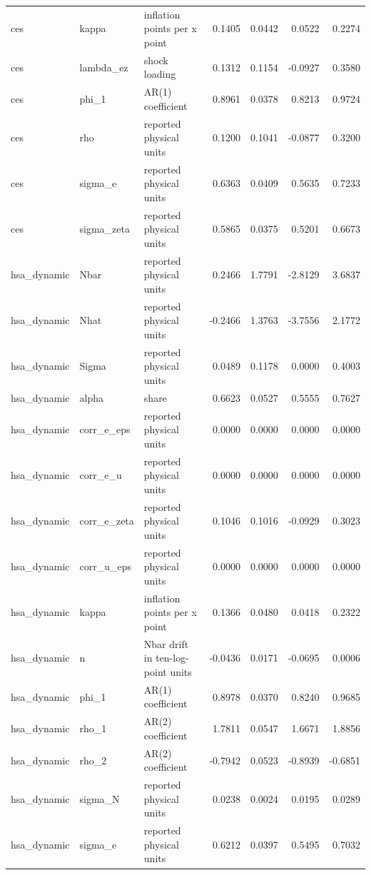 \begin{tabular}{lllrrrr}
ces & kappa & inflation points per x point & 0.1405 & 0.0442 & 0.0522 & 0.2274 \\
ces & lambda\_ez & shock loading & 0.1312 & 0.1154 & -0.0927 & 0.3580 \\
ces & phi\_1 & AR(1) coefficient & 0.8961 & 0.0378 & 0.8213 & 0.9724 \\
ces & rho & reported physical units & 0.1200 & 0.1041 & -0.0877 & 0.3200 \\
ces & sigma\_e & reported physical units & 0.6363 & 0.0409 & 0.5635 & 0.7233 \\
ces & sigma\_zeta & reported physical units & 0.5865 & 0.0375 & 0.5201 & 0.6673 \\
hsa\_dynamic & Nbar & reported physical units & 0.2466 & 1.7791 & -2.8129 & 3.6837 \\
hsa\_dynamic & Nhat & reported physical units & -0.2466 & 1.3763 & -3.7556 & 2.1772 \\
hsa\_dynamic & Sigma & reported physical units & 0.0489 & 0.1178 & 0.0000 & 0.4003 \\
hsa\_dynamic & alpha & share & 0.6623 & 0.0527 & 0.5555 & 0.7627 \\
hsa\_dynamic & corr\_e\_eps & reported physical units & 0.0000 & 0.0000 & 0.0000 & 0.0000 \\
hsa\_dynamic & corr\_e\_u & reported physical units & 0.0000 & 0.0000 & 0.0000 & 0.0000 \\
hsa\_dynamic & corr\_e\_zeta & reported physical units & 0.1046 & 0.1016 & -0.0929 & 0.3023 \\
hsa\_dynamic & corr\_u\_eps & reported physical units & 0.0000 & 0.0000 & 0.0000 & 0.0000 \\
hsa\_dynamic & kappa & inflation points per x point & 0.1366 & 0.0480 & 0.0418 & 0.2322 \\
hsa\_dynamic & n & Nbar drift in ten-log-point units & -0.0436 & 0.0171 & -0.0695 & 0.0006 \\
hsa\_dynamic & phi\_1 & AR(1) coefficient & 0.8978 & 0.0370 & 0.8240 & 0.9685 \\
hsa\_dynamic & rho\_1 & AR(2) coefficient & 1.7811 & 0.0547 & 1.6671 & 1.8856 \\
hsa\_dynamic & rho\_2 & AR(2) coefficient & -0.7942 & 0.0523 & -0.8939 & -0.6851 \\
hsa\_dynamic & sigma\_N & reported physical units & 0.0238 & 0.0024 & 0.0195 & 0.0289 \\
hsa\_dynamic & sigma\_e & reported physical units & 0.6212 & 0.0397 & 0.5495 & 0.7032 \\

\end{tabular}
